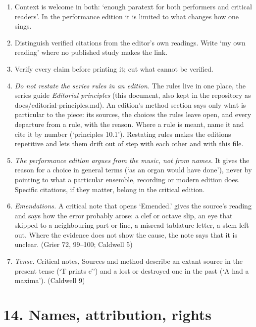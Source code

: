\begin{enumerate}

\tightlist
\item
  Context is welcome in both: ‘enough paratext for both performers and critical readers’. In the performance edition it is limited to what changes how one sings.
\item
  Distinguish verified citations from the editor's own readings. Write ‘my own reading’ where no published study makes the link.
\item
  Verify every claim before printing it; cut what cannot be verified.
\item
  \textit{Do not restate the series rules in an edition.} The rules live in one place, the series guide \emph{Editorial principles} (this document, also kept in the repository as docs/editorial-principles.md). An edition's method section says only what is particular to the piece: its sources, the choices the rules leave open, and every departure from a rule, with the reason. Where a rule is meant, name it and cite it by number (‘principles 10.1’). Restating rules makes the editions repetitive and lets them drift out of step with each other and with this file.
\item
  \textit{The performance edition argues from the music, not from names.} It gives the reason for a choice in general terms (‘as an organ would have done’), never by pointing to what a particular ensemble, recording or modern edition does. Specific citations, if they matter, belong in the critical edition.
\item
  \textit{Emendations.} A critical note that opens ‘Emended.’ gives the source's reading and says how the error probably arose: a clef or octave slip, an eye that skipped to a neighbouring part or line, a misread tablature letter, a stem left out. Where the evidence does not show the cause, the note says that it is unclear. (Grier 72, 99--100; Caldwell 5)
\item
  \textit{Tense.} Critical notes, Sources and method describe an extant source in the present tense (`T prints e′') and a lost or destroyed one in the past (`A had a maxima'). (Caldwell 9)
\end{enumerate}

\section*{14. Names, attribution, rights}

